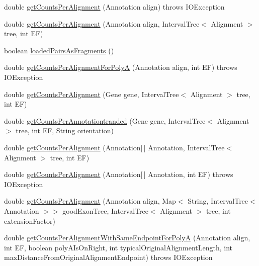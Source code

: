 \begin{DoxyCompactItemize}
\item 
double \hyperlink{classbroad_1_1pda_1_1seq_1_1segmentation_1_1_generic_alignment_data_model_a440f4aad672f0f7fdcc89f97743eb13d}{get\+Counts\+Per\+Alignment} (Annotation align)  throws I\+O\+Exception
\item 
double \hyperlink{classbroad_1_1pda_1_1seq_1_1segmentation_1_1_generic_alignment_data_model_ab125dc0da7450a18ed1c9c05efdc2cb1}{get\+Counts\+Per\+Alignment} (Annotation align, Interval\+Tree$<$ Alignment $>$ tree, int E\+F)
\item 
boolean \hyperlink{classbroad_1_1pda_1_1seq_1_1segmentation_1_1_generic_alignment_data_model_a5875f9097a1103a86034ffef4aa252cf}{loaded\+Pairs\+As\+Fragments} ()
\item 
double \hyperlink{classbroad_1_1pda_1_1seq_1_1segmentation_1_1_generic_alignment_data_model_a569f25df717cd394c8e5258355f75eed}{get\+Counts\+Per\+Alignment\+For\+Poly\+A} (Annotation align, int E\+F)  throws I\+O\+Exception
\item 
double \hyperlink{classbroad_1_1pda_1_1seq_1_1segmentation_1_1_generic_alignment_data_model_abdcc9dba34ae9960c29fefd5b631212e}{get\+Counts\+Per\+Alignment} (Gene gene, Interval\+Tree$<$ Alignment $>$ tree, int E\+F)
\item 
double \hyperlink{classbroad_1_1pda_1_1seq_1_1segmentation_1_1_generic_alignment_data_model_aa7f82dd0b8dd66f73c9148b4ec533022}{get\+Counts\+Per\+Annotationtranded} (Gene gene, Interval\+Tree$<$ Alignment $>$ tree, int E\+F, String orientation)
\item 
double \hyperlink{classbroad_1_1pda_1_1seq_1_1segmentation_1_1_generic_alignment_data_model_addf3cd1305b424740cda98268a4db541}{get\+Counts\+Per\+Alignment} (Annotation\mbox{[}$\,$\mbox{]} Annotation, Interval\+Tree$<$ Alignment $>$ tree, int E\+F)
\item 
double \hyperlink{classbroad_1_1pda_1_1seq_1_1segmentation_1_1_generic_alignment_data_model_ae1caac367e554184ec514b839a0cdee1}{get\+Counts\+Per\+Alignment} (Annotation\mbox{[}$\,$\mbox{]} Annotation, int E\+F)  throws I\+O\+Exception
\item 
double \hyperlink{classbroad_1_1pda_1_1seq_1_1segmentation_1_1_generic_alignment_data_model_a1613e249e2e63d9e5a51b96400f67a1e}{get\+Counts\+Per\+Alignment} (Annotation align, Map$<$ String, Interval\+Tree$<$ Annotation $>$$>$ good\+Exon\+Tree, Interval\+Tree$<$ Alignment $>$ tree, int extension\+Factor)
\item 
double \hyperlink{classbroad_1_1pda_1_1seq_1_1segmentation_1_1_generic_alignment_data_model_a90f008b83d90599a72bec79bc7be3dde}{get\+Counts\+Per\+Alignment\+With\+Same\+Endpoint\+For\+Poly\+A} (Annotation align, int E\+F, boolean poly\+A\+Is\+On\+Right, int typical\+Original\+Alignment\+Length, int max\+Distance\+From\+Original\+Alignment\+Endpoint)  throws I\+O\+Exception
$$
\end{DoxyCompactItemize}
